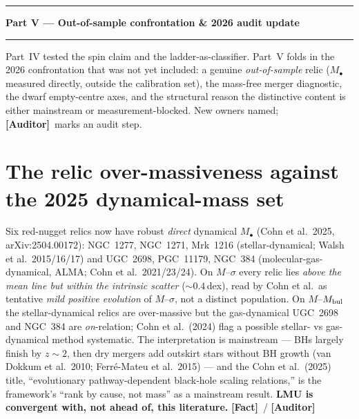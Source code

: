 \documentclass[11pt]{article}
\newcommand{\Fact}{\textbf{\textcolor{green!45!black}{[Fact]}}}
\newcommand{\Auditor}{\textbf{\textcolor{teal!55!black}{[Auditor]}}}
\newcommand{\Mbh}{M_{\bullet}}
\begin{document}
\vspace{10pt}\hrule\vspace{2pt}
\begin{center}{\LARGE\bfseries Part V --- Out-of-sample confrontation \& 2026 audit update}\end{center}
\vspace{1pt}\hrule\vspace{5pt}
{\small Part~IV tested the spin claim and the ladder-as-classifier. Part~V folds in the 2026 confrontation that was not yet included: a genuine \emph{out-of-sample} relic ($\Mbh$ measured directly, outside the calibration set), the mass-free merger diagnostic, the dwarf empty-centre axes, and the structural reason the distinctive content is either mainstream or measurement-blocked. New owners named; \Auditor\ marks an audit step.}

\section{The relic over-massiveness against the 2025 dynamical-mass set}
Six red-nugget relics now have robust \emph{direct} dynamical $\Mbh$ (Cohn et al.\ 2025, arXiv:2504.00172): NGC~1277, NGC~1271, Mrk~1216 (stellar-dynamical; Walsh et al.\ 2015/16/17) and UGC~2698, PGC~11179, NGC~384 (molecular-gas-dynamical, ALMA; Cohn et al.\ 2021/23/24). On $M$--$\sigma$ every relic lies \emph{above the mean line but within the intrinsic scatter} ($\sim0.4$\,dex), read by Cohn et al.\ as tentative \emph{mild positive evolution} of $M$--$\sigma$, not a distinct population. On $M$--$M_{\rm bul}$ the stellar-dynamical relics are over-massive but the gas-dynamical UGC~2698 and NGC~384 are \emph{on}-relation; Cohn et al.\ (2024) flag a possible stellar- vs gas-dynamical method systematic. The interpretation is mainstream --- BHs largely finish by $z\!\sim\!2$, then dry mergers add outskirt stars without BH growth (van Dokkum et al.\ 2010; Ferr\'e-Mateu et al.\ 2015) --- and the Cohn et al.\ (2025) title, ``evolutionary pathway-dependent black-hole scaling relations,'' is the framework's ``rank by cause, not mass'' as a mainstream result. \textbf{LMU is convergent with, not ahead of, this literature.} \Fact\ / \Auditor
\end{document}
